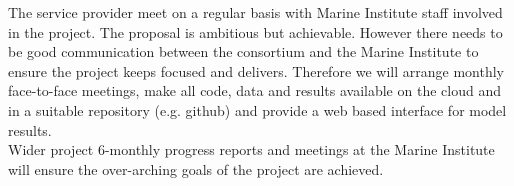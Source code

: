 

The service provider meet on a regular basis with Marine Institute staff involved in the project. 
The proposal is ambitious but achievable. However there needs to be good communication between the consortium and the Marine Institute to ensure the project keeps focused and delivers. Therefore we will arrange monthly face-to-face meetings, make all code, data and results available on the cloud and in a suitable repository (e.g. github) and provide a web based interface for model results.\\
Wider project 6-monthly progress reports and meetings at the Marine Institute will ensure the over-arching goals of the project are achieved.
